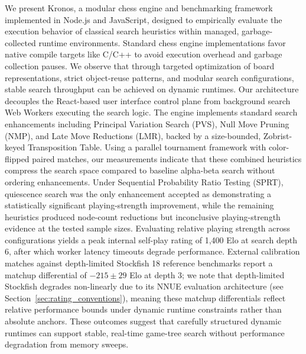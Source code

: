 We present Kronos, a modular chess engine and benchmarking framework implemented in Node.js and JavaScript, designed to empirically evaluate the execution behavior of classical search heuristics within managed, garbage-collected runtime environments. Standard chess engine implementations favor native compile targets like C/C++ to avoid execution overhead and garbage collection pauses. We observe that through targeted optimization of board representations, strict object-reuse patterns, and modular search configurations, stable search throughput can be achieved on dynamic runtimes. Our architecture decouples the React-based user interface control plane from background search Web Workers executing the search logic. The engine implements standard search enhancements including Principal Variation Search (PVS), Null Move Pruning (NMP), and Late Move Reductions (LMR), backed by a size-bounded, Zobrist-keyed Transposition Table. Using a parallel tournament framework with color-flipped paired matches, our measurements indicate that these combined heuristics compress the search space compared to baseline alpha-beta search without ordering enhancements. Under Sequential Probability Ratio Testing (SPRT), quiescence search was the only enhancement accepted as demonstrating a statistically significant playing-strength improvement, while the remaining heuristics produced node-count reductions but inconclusive playing-strength evidence at the tested sample sizes. Evaluating relative playing strength across configurations yields a peak internal self-play rating of 1,400 Elo at search depth 6, after which worker latency timeouts degrade performance. External calibration matches against depth-limited Stockfish 18 reference benchmarks report a matchup differential of $-215 \pm 29$ Elo at depth 3; we note that depth-limited Stockfish degrades non-linearly due to its NNUE evaluation architecture (see Section~\ref{sec:rating_conventions}), meaning these matchup differentials reflect relative performance bounds under dynamic runtime constraints rather than absolute anchors. These outcomes suggest that carefully structured dynamic runtimes can support stable, real-time game-tree search without performance degradation from memory sweeps.
